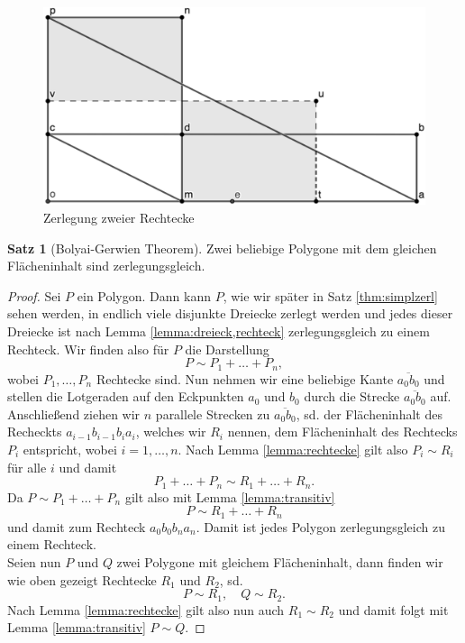 \documentclass[11pt,titlepage]{article}
\theoremstyle{definition}
\newtheorem{theorem}{Satz}[section]
\theoremstyle{remark}
\begin{document}
	\begin{figure}[!htbp]
		\centering
		\includegraphics[scale=0.8]{Rechteck2}
		\caption{Zerlegung zweier Rechtecke}
		\label{Abb.3}
	\end{figure}
	
	\begin{theorem}[Bolyai-Gerwien Theorem] \label{theorem:bolyai-gerwien}
		Zwei beliebige Polygone mit dem gleichen Flächeninhalt sind zerlegungsgleich.
	\end{theorem}
	
	\begin{proof}
		Sei $P$ ein Polygon. Dann kann $P$, wie wir später in Satz \ref{thm:simplzerl} sehen werden, in endlich viele disjunkte Dreiecke zerlegt werden und jedes dieser 
		Dreiecke ist nach Lemma \ref{lemma:dreieck,rechteck} zerlegungsgleich zu einem Rechteck. Wir finden 
		also für $P$ die Darstellung
		\[ P\sim P_1+\ldots+P_n,\]
		wobei $P_1,\ldots,P_n$ Rechtecke sind. Nun nehmen wir eine beliebige Kante $\overline{a_0b_0}$ und 
		stellen die Lotgeraden auf den Eckpunkten $a_0$ und $b_0$ durch die Strecke $\overline{a_0b_0}$ 
		auf. Anschließend ziehen wir $n$ 
		parallele Strecken zu $\overline{a_0b_0}$, sd. der Flächeninhalt des Recheckts $a_{i-1}b_{i-1}b_ia_i$, 
		welches wir $R_i$ nennen, dem Flächeninhalt des Rechtecks $P_i$ entspricht, wobei $i=1,\ldots,n$. 
		Nach Lemma \ref{lemma:rechtecke} gilt also $P_i\sim R_i$ für alle $i$ und damit
		\[ P_1+\ldots+P_n\sim R_1+\ldots+R_n. \]
		Da $P\sim P_1+\ldots+P_n$ gilt also mit Lemma \ref{lemma:transitiv}
		\[ P\sim R_1+\ldots+R_n\]
		und damit zum Rechteck $a_0b_0b_na_n$. Damit ist jedes Polygon zerlegungsgleich zu einem Rechteck. \\
		Seien nun $P$ und $Q$ zwei Polygone mit gleichem Flächeninhalt, dann finden wir wie oben gezeigt 
		Rechtecke $R_1$ und $R_2$, sd.
		\[ P\sim R_1,\quad Q\sim R_2.\]
		Nach Lemma \ref{lemma:rechtecke} gilt also nun auch $R_1\sim R_2$ und damit folgt mit Lemma 
		\ref{lemma:transitiv} $P\sim Q$.
	\end{proof}
	
\end{document}
